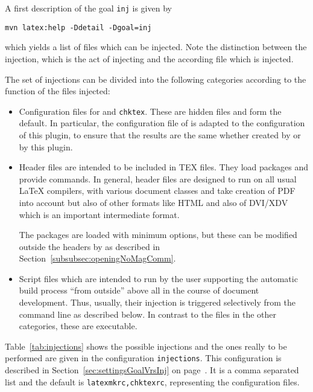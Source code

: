 A first description of the goal \texttt{inj} is given by 
%
\begin{verbatim}
mvn latex:help -Ddetail -Dgoal=inj
\end{verbatim}
%
which yields a list of files which can be injected. 
Note the distinction between the injection, which is the act of injecting 
and the according file which is injected. 

The set of injections can be divided into the following categories 
according to the function of the files injected: 
%
\begin{itemize}
  \item
  Configuration files for  and \texttt{chktex}. 
  These are hidden files and form the default. 
  In particular, the configuration file of  
  is adapted to the configuration of this plugin, 
  to ensure that the results are the same whether created by  
  or by this plugin. 
  \item
  Header files are intended to be included in TEX files. 
  They load packages and provide commands. 
  In general, header files are designed to run on all usual \LaTeX{} compilers, 
  with various document classes  
  and take creation of PDF into account but also of other formats like HTML 
  and also of DVI/XDV which is an important intermediate format. 

  The packages are loaded with minimum options, 
  but these can be modified outside the headers by  
  as described in Section~\ref{subsubsec:openingNoMagComm}. 
  \item
  Script files which are intended to run by the user 
  supporting the automatic build process ``from outside''
  above all in the course of document development. 
  Thus, usually, their injection is triggered selectively from the command line 
  as described below. 
  In contrast to the files in the other categories, these are executable. 
\end{itemize}

Table~\ref{tab:injections} shows the possible injections 
and the ones really to be performed are given in the configuration \texttt{injections}. 
This configuration is described in Section~\ref{sec:settingsGoalVrsInj} 
on page~\pageref{sec:settingsGoalVrsInj}. 
It is a comma separated list and the default is \texttt{latexmkrc,chktexrc}, 
representing the configuration files. 


